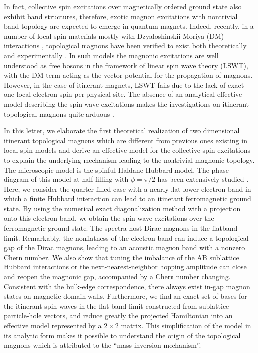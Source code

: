 \documentclass[amsmath,superscriptaddress,showpacs,aps,prl,twocolumn]{revtex4-1}
\begin{document}
\par In fact, collective spin excitations over magnetically ordered ground state also exhibit band structures, therefore, exotic magnon excitations with nontrivial band topology are expected to emerge in quantum magnets. Indeed, recently, in a number of local spin materials mostly with Dzyaloshinskii-Moriya (DM) interactions \cite{Dzyaloshinsky_JPCS1958,Moriya_PR1960}, topological magnons have been verified to exist both theoretically \cite{Zhang_PRB2013,Owerre_JPCM2016,Li_NC2016,Mook_PRL2016,Laurell_PRL2017} and experimentally \cite{Onose_S2010,Chisnell_PRL2015,Yao_NP2018,Bao_NC2018}. In such models the magnonic excitations are well understood as free bosons in the framework of linear spin wave theory (LSWT), with the DM term acting as the vector potential for the propagation of magnons. However, in the case of itinerant magnets, LSWT fails due to the lack of exact one local electron spin per physical site. The absence of an analytical effective model describing the spin wave excitations makes the investigations on itinerant topological magnons quite arduous \cite{Su_PRB2018}.

\par In this letter, we elaborate the first theoretical realization of two dimensional itinerant topological magnons which are different from previous ones existing in local spin models and derive an effective model for the collective spin excitations to explain the underlying mechanism leading to the nontrivial magnonic topology. The microscopic model is the spinful Haldane-Hubbard model. The phase diagram of this model at half-filling with $\phi=\pi/2$ has been extensively studied \cite{He_PRB2011a,Maciejko_PRB2013,Zheng_PRB2015,Hickey_PRL2016,Wu_PRB2016,Vanhala_PRL2016,Imriska_PRB2016,Giuliani_PRB2016,Garcia_NJP2018,Gu_NJP2019}. Here, we consider the quarter-filled case with a nearly-flat lower electron band in which a finite Hubbard interaction can lead to an itinerant ferromagnetic ground state. By using the numerical exact diagonalization method with a projection onto this electron band, we obtain the spin wave excitations over the ferromagnetic ground state. The spectra host Dirac magnons in the flatband limit. Remarkably, the nonflatness of the electron band can induce a topological gap of the Dirac magnons, leading to an acoustic magnon band with a nonzero Chern number. We also show that tuning the imbalance of the AB sublattice Hubbard interactions or the next-nearest-neighbor hopping amplitude can close and reopen the magnonic gap, accompanied by a Chern number changing. Consistent with the bulk-edge correspondence, there always exist in-gap magnon states on magnetic domain walls.
Furthermore, we find an exact set of bases for the itinerant spin waves in the flat band limit constructed from sublattice particle-hole vectors, and reduce greatly the projected Hamiltonian into an effective model represented by a $2\times2$ matrix. This simplification of the model in its analytic form makes it possible to understand the origin of the topological magnons which is attributed to the ``mass inversion mechanism''.
\end{document}
